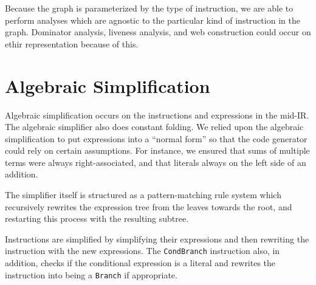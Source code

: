 \documentclass[11pt]{article}
\begin{document}
Because the graph is parameterized by the type of instruction, we are
able to perform analyses which are agnostic to the particular kind of
instruction in the graph.  Dominator analysis, liveness analysis, and
web construction could occur on ethir representation because of this.

\section {Algebraic Simplification} 
\label{sec:algebra}

Algebraic simplification occurs on the instructions and expressions in
the mid-IR.  The algebraic simplifier also does constant folding.  We
relied upon the algebraic simplification to put expressions into a
``normal form'' so that the code generator could rely on certain
assumptions.  For instance, we ensured that sums of multiple terms
were always right-associated, and that literals always on the left
side of an addition.

The simplifier itself is structured as a pattern-matching rule system
which recursively rewrites the expression tree from the leaves towards
the root, and restarting this process with the resulting subtree.

Instructions are simplified by simplifying their expressions and then
rewriting the instruction with the new expressions.  The
\texttt{CondBranch} instruction also, in addition, checks if the
conditional expression is a literal and rewrites the instruction into
being a \texttt{Branch} if appropriate.
\end{document}
